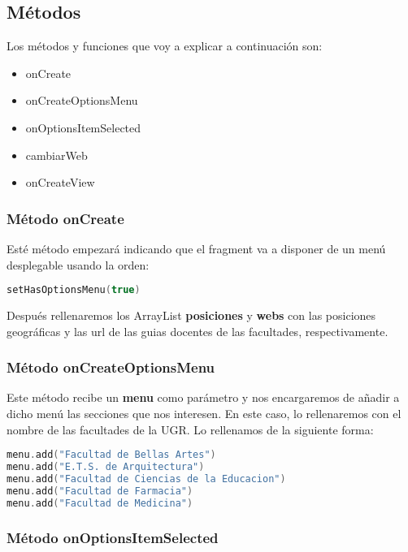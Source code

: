 \newpage

\subsection{Métodos}

Los métodos y funciones que voy a explicar a continuación son:

\begin{itemize}
\item{onCreate}
\item{onCreateOptionsMenu}
\item{onOptionsItemSelected}
\item{cambiarWeb}
\item{onCreateView}
\end{itemize}

\subsubsection{Método onCreate}

Esté método empezará indicando que el fragment va a disponer de un menú desplegable usando la orden:

\begin{lstlisting}[language=Kotlin]
setHasOptionsMenu(true)
\end{lstlisting}

Después rellenaremos los ArrayList \textbf{posiciones} y \textbf{webs} con las posiciones geográficas y las url de las guias docentes de las facultades, respectivamente.

\subsubsection{Método onCreateOptionsMenu}

Este método recibe un \textbf{menu}\cite{menusAndroid} como parámetro y nos encargaremos de añadir a dicho menú las secciones que nos interesen. En este caso, lo rellenaremos con el nombre de las facultades de la UGR. Lo rellenamos de la siguiente forma:

\begin{lstlisting}[language=Kotlin]
menu.add("Facultad de Bellas Artes")
menu.add("E.T.S. de Arquitectura")
menu.add("Facultad de Ciencias de la Educacion")
menu.add("Facultad de Farmacia")
menu.add("Facultad de Medicina")
\end{lstlisting}

\newpage

\subsubsection{Método onOptionsItemSelected}

